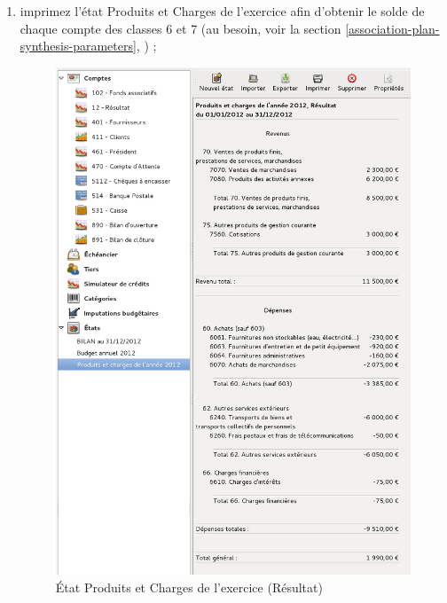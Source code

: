 \begin{enumerate}
	\item imprimez l'état Produits et Charges de l'exercice afin d'obtenir le solde de chaque compte des classes 6 et 7 \ifIllustration {}
	\else
	\fi (au besoin, voir la section \vref{association-plan-synthesis-parameters}, ) ;

\ifIllustration
\begin{figure}[p]
\begin{center}
\includegraphics[scale=0.5]{image/screenshot/asso_chargesProducts}
\end{center}
\caption{État Produits et Charges de l'exercice (Résultat)}
\label{asso-chargesProducts-img}
\end{figure}
\fi


\end{enumerate}
